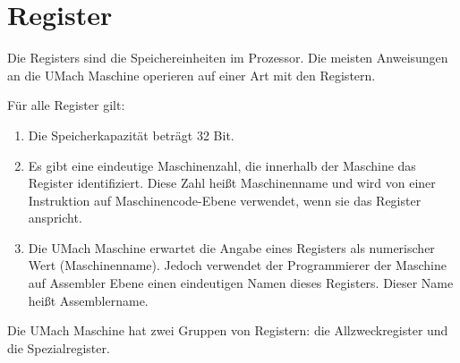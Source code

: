\section{Register}
\label{sec:Register}

Die \glspl{Register} sind die Speichereinheiten im Prozessor.
Die meisten Anweisungen an die UMach Maschine operieren auf einer Art mit den
Registern.

Für alle Register gilt:
\begin{enumerate}
  \item Die Speicherkapazität beträgt 32 Bit.
  \item Es gibt eine eindeutige Maschinenzahl, die innerhalb der
    Maschine das Register identifiziert. Diese Zahl heißt
    \gls{Maschinenname}
    und wird von einer Instruktion auf Maschinencode-Ebene verwendet, wenn sie
    das Register anspricht.
  \item Die UMach Maschine erwartet die Angabe eines Registers als numerischer
    Wert (Maschinenname). Jedoch verwendet der Programmierer der Maschine auf
    Assembler Ebene einen eindeutigen Namen dieses Registers.
    Dieser Name heißt
    \gls{Assemblername}.
\end{enumerate}

Die UMach Maschine hat zwei Gruppen von Registern: die Allzweckregister und
die Spezialregister. 




